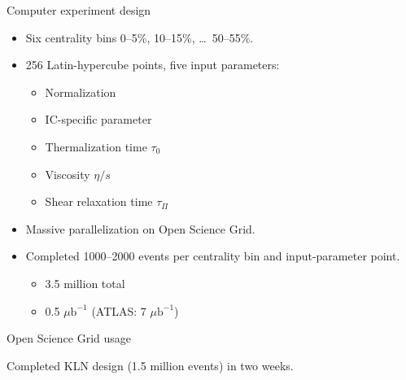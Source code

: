 \documentclass{beamer}
\begin{document}
\begin{frame}{Computer experiment design}
  \begin{itemize}
    \item Six centrality bins 0--5\%, 10--15\%, \ldots\ 50--55\%.
    \item 256 Latin-hypercube points, five input parameters:
      \begin{itemize}
        \item Normalization
        \item IC-specific parameter
        \item Thermalization time $\tau_0$
        \item Viscosity $\eta/s$
        \item Shear relaxation time $\tau_\Pi$
      \end{itemize}
  \end{itemize}
  \begin{itemize}
    \item Massive parallelization on Open Science Grid.
    \item Completed 1000--2000 events per centrality bin and input-parameter point.
      \begin{itemize}
        \item 3.5 million total
        \item 0.5 $\mu\text{b}^{-1}$  (ATLAS:  7 $\mu\text{b}^{-1}$)
      \end{itemize}
  \end{itemize}

\end{frame}


\begin{frame}{Open Science Grid usage}
  \centering
  Completed KLN design (1.5 million events) in two weeks.
\end{frame}
\end{document}
